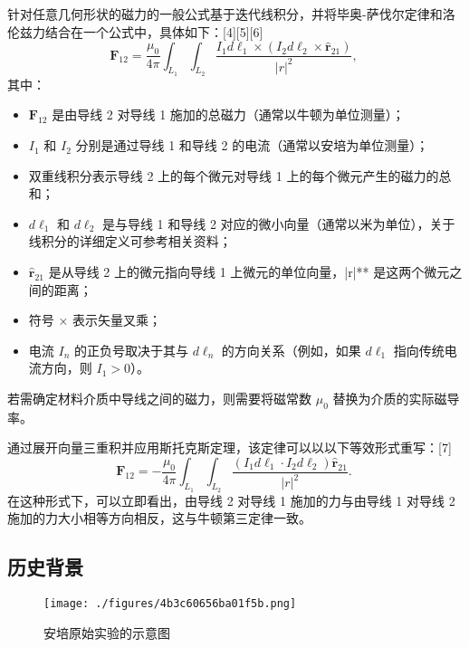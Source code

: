 针对任意几何形状的磁力的一般公式基于迭代线积分，并将毕奥-萨伐尔定律和洛伦兹力结合在一个公式中，具体如下：[4][5][6]
\[
\mathbf{F}_{12} = \frac{\mu_0}{4\pi} \int_{L_1} \int_{L_2} \frac{I_1 d\boldsymbol{\ell}_1 \times \left( I_2 d\boldsymbol{\ell}_2 \times \hat{\mathbf{r}}_{21} \right)}{|r|^2},~
\]
其中：
\begin{itemize}
\item \( \mathbf{F}_{12} \) 是由导线 2 对导线 1 施加的总磁力（通常以牛顿为单位测量）；
\item \( I_1 \) 和 \( I_2 \) 分别是通过导线 1 和导线 2 的电流（通常以安培为单位测量）；
\item 双重线积分表示导线 2 上的每个微元对导线 1 上的每个微元产生的磁力的总和；
\item \( d\boldsymbol{\ell}_1 \) 和 \( d\boldsymbol{\ell}_2 \) 是与导线 1 和导线 2 对应的微小向量（通常以米为单位），关于线积分的详细定义可参考相关资料；
\item \( \hat{\mathbf{r}}_{21} \) 是从导线 2 上的微元指向导线 1 上微元的单位向量，|r|** 是这两个微元之间的距离；
\item 符号 × 表示矢量叉乘；
\item 电流 \( I_n \) 的正负号取决于其与 \( d\boldsymbol{\ell}_n \) 的方向关系（例如，如果 \( d\boldsymbol{\ell}_1 \) 指向传统电流方向，则 \( I_1 > 0 \)）。
\end{itemize}

若需确定材料介质中导线之间的磁力，则需要将磁常数 \( \mu_0 \) 替换为介质的实际磁导率。

通过展开向量三重积并应用斯托克斯定理，该定律可以以以下等效形式重写：[7]
\[
\mathbf{F}_{12} = -\frac{\mu_0}{4\pi} \int_{L_1} \int_{L_2} \frac{\left( I_1 d\boldsymbol{\ell}_1 \cdot I_2 d\boldsymbol{\ell}_2 \right) \hat{\mathbf{r}}_{21}}{|r|^2}.~
\]
在这种形式下，可以立即看出，由导线 2 对导线 1 施加的力与由导线 1 对导线 2 施加的力大小相等方向相反，这与牛顿第三定律一致。
\subsection{历史背景}
\begin{figure}[ht]
\centering
\texttt{[image: ./figures/4b3c60656ba01f5b.png]}
\caption{安培原始实验的示意图} \label{fig_APDL_1}
\end{figure}

